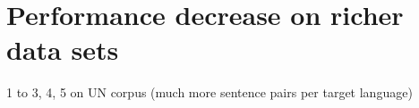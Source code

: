 % 

\section{Performance decrease on richer data sets}
1 to 3, 4, 5 on UN corpus (much more sentence pairs per target language)
\cite{eisele-chen-2010-multiun}


